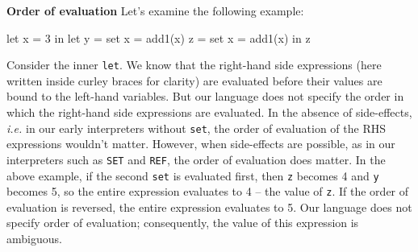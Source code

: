 \begin{minipage}[t]{\sw}
\slidenumber
\LARGE
{\bf Order of evaluation}\exx
\Large
Let's examine the following example:
\begin{qv}
let
  x = 3
in
  let
    y = {set x = add1(x)}
    z = {set x = add1(x)}
  in
    z
\end{qv}
Consider the inner \verb'let'.
We know that the right-hand side expressions
(here written inside curley braces for clarity)
are evaluated before their values are bound
to the left-hand variables.
But our language does not specify the order
in which the right-hand side expressions are evaluated.\exx
In the absence of side-effects,
{\em i.e.} in our early interpreters without \verb'set',
the order of evaluation of the RHS expressions wouldn't matter.
However, when side-effects are possible,
as in our interpreters such as \verb'SET' and \verb'REF',
the order of evaluation does matter.\exx
In the above example, if the second \verb'set' is evaluated first,
then \verb'z' becomes 4 and \verb'y' becomes 5,
so the entire expression evaluates to 4 -- the value of \verb'z'.
If the order of evaluation is reversed,
the entire expression evaluates to 5.
Our language does not specify order of evaluation;
consequently, the value of this expression is ambiguous.
\end{minipage}
\clearpage
